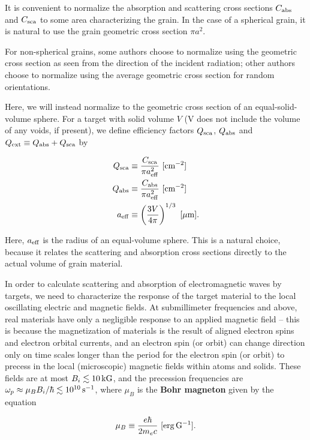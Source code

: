 \documentclass[a4paper,10pt]{article}
\begin{document}
{\noindent}It is convenient to normalize the absorption and scattering cross sections $C_{\rm abs}$ and $C_{\rm sca}$ to some area characterizing the grain. In the case of a spherical grain, it is natural to use the grain geometric cross section $\pi a^2$.

{\noindent}For non-spherical grains, some authors choose to normalize using the geometric cross section as seen from the direction of the incident radiation; other authors choose to normalize using the average geometric cross section for random orientations.

{\noindent}Here, we will instead normalize to the geometric cross section of an equal-solid-volume sphere. For a target with solid volume $V$ (V does not include the volume of any voids, if present), we define efficiency factors $Q_{\rm sca}$, $Q_{\rm abs}$ and $Q_{\rm ext} \equiv Q_{\rm abs} + Q_{\rm sca}$ by

\begin{align*}
    Q_{\rm sca} &\equiv \frac{C_{\rm sca}}{\pi a_{\rm eff}^2} ~ [{\rm cm^{-2}}] \\
    Q_{\rm abs} &\equiv \frac{C_{\rm abs}}{\pi a_{\rm eff}^2} ~ [{\rm cm^{-2}}] \\
    a_{\rm eff} &\equiv \left(\frac{3V}{4\pi}\right)^{1/3}  ~ [{\rm \mu m}].
\end{align*}

{\noindent}Here, $a_{\rm eff}$ is the radius of an equal-volume sphere. This is a natural choice, because it relates the scattering and absorption cross sections directly to the actual volume of grain material.

{\noindent}In order to calculate scattering and absorption of electromagnetic waves by targets, we need to characterize the response of the target material to the local oscillating electric and magnetic fields. At submillimeter frequencies and above, real materials have only a negligible response to an applied magnetic field -- this is because the magnetization of materials is the result of aligned electron spins and electron orbital currents, and an electron spin (or orbit) can change direction only on time scales longer than the period for the electron spin (or orbit) to precess in the local (microscopic) magnetic fields within atoms and solids. These fields are at most $B_i\lesssim10\,{\rm kG}$, and the precession frequencies are $\omega_p\approx \mu_BB_i/\hbar\lesssim10^{10}\,{\rm s^{-1}}$, where $\mu_B$ is the \textbf{Bohr magneton} given by the equation

\begin{align*}
    \mu_B \equiv \frac{e\hbar}{2m_ec} ~ [{\rm erg\,G^{-1}}].
\end{align*}
\end{document}
